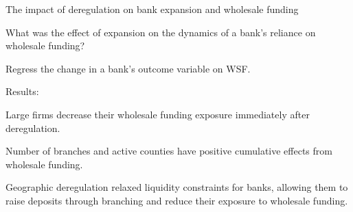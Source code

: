 \documentclass[notes,10pt, aspectratio=169]{beamer}
\newenvironment{wideitemize}{\itemize\addtolength{\itemsep}{10pt}}{\enditemize}
\begin{document}
        \begin{frame}{The impact of deregulation on bank expansion and wholesale funding}\label{der_impact}
            \begin{wideitemize}
                \item What was the effect of expansion on the dynamics of a bank’s reliance on wholesale funding? %
                
                \item Regress the change in a bank's outcome variable on WSF. \hyperlink{der_impact1}{}
            \item Results:
            \vspace{0.2cm}
                \begin{wideitemize}
        \item Large firms decrease their wholesale funding
        exposure immediately after deregulation. %

        \item  Number of branches and active counties have positive cumulative effects from wholesale funding. 

        \item Geographic deregulation relaxed liquidity constraints for banks,
        allowing them to raise deposits through branching and reduce their exposure to wholesale
        funding. 

            \end{wideitemize}
                
            \end{wideitemize}

              
    \end{frame}
    
\end{document}
